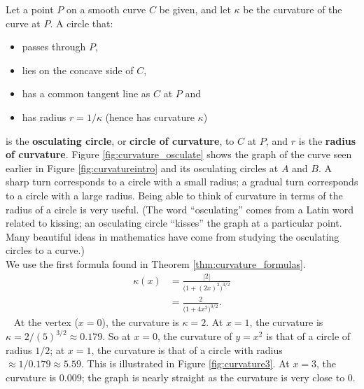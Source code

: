 Let a point $P$ on a smooth curve $C$  be given, and let $\kappa$ be the curvature of the curve at $P$. A circle that:
	\begin{itemize}
		\item passes through $P$,
		\item	lies on the concave side of $C$,
		\item	has a common tangent line as $C$ at $P$ and
		\item	has radius $r=1/\kappa$ (hence has curvature $\kappa$)
	\end{itemize}
is the \textbf{osculating circle}, or \textbf{circle of curvature}, to $C$ at $P$, and $r$ is the \textbf{radius of curvature}. %
Figure \ref{fig:curvature_osculate} shows the graph of the curve seen earlier in Figure \ref{fig:curvatureintro} and its osculating circles at $A$ and $B$. A sharp turn corresponds to a circle with a small radius; a gradual turn corresponds to a circle with a large radius. Being able to think of curvature in terms of the radius of a circle is very useful.
 (The word ``osculating'' comes from a Latin word related to kissing; an osculating circle ``kisses'' the graph at a particular point. Many beautiful ideas in mathematics have come from studying the osculating circles to a curve.)\\

{We use the first formula found in Theorem \ref{thm:curvature_formulas}. 
\begin{align*}
\kappa(x) &= \frac{|2|}{\big(1+(2x)^2\big)^{3/2}} \\
			&= \frac2{\big(1+4x^2\big)^{3/2}}.
\end{align*}\
At the vertex ($x=0$), the curvature is $\kappa = 2$. At $x=1$, the curvature is $\kappa = 2/(5)^{3/2} \approx 0.179.$ So at $x=0$, the curvature of $y=x^2$ is that of a circle of radius $1/2$; at $x=1$, the curvature is that of a circle with radius $\approx 1/0.179 \approx 5.59$. This is illustrated in Figure \ref{fig:curvature3}. At $x=3$, the curvature is $0.009$; the graph is nearly straight as the curvature is very close to 0. 
}\\

